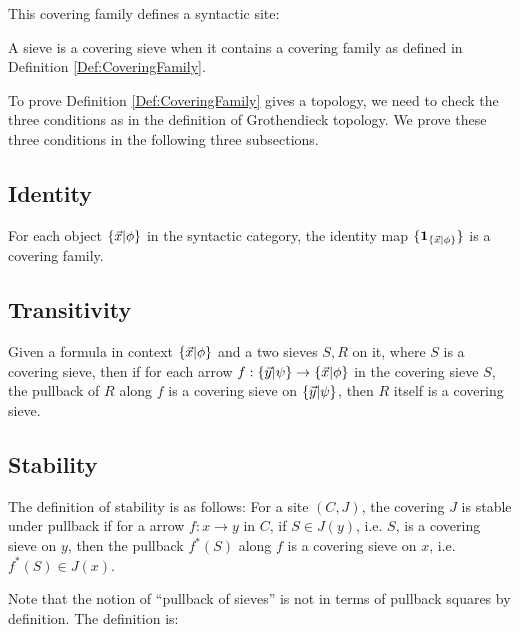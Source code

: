 This covering family defines a syntactic site:

\begin{definition}
  A sieve is a covering sieve when it contains a covering family as defined in Definition \ref{Def:CoveringFamily}. 
\end{definition}

To prove Definition \ref{Def:CoveringFamily} gives a topology, we need to check the three conditions as in the definition of Grothendieck
topology.
We prove these three conditions in the following three subsections.

\subsection{Identity}
\begin{lemma}
  For each object $\{ \vec{x} | \phi \}$ in the syntactic category, the identity map $\{\mathbf{1}_{\{ \vec{x} | \phi \}}\}$ is a covering family.
\end{lemma}

\subsection{Transitivity}
\begin{lemma}[Transitivity]
  Given a formula in context $\{ \vec{x} | \phi \}$ and a two sieves $S,R$ on it, where $S$ is a covering sieve, then if for each arrow $f:\{ \vec{y} | \psi \}\to\{ \vec{x} | \phi \}$ in the
  covering sieve $S$, the pullback of $R$ along $f$ is a covering sieve on $\{ \vec{y} | \psi \}$, then $R$ itself is a covering sieve.
\end{lemma}



\subsection{Stability}

The definition of stability is as follows: For a site $(C,J)$, the covering $J$ is stable under pullback if for a arrow $f:x\to y$ in $C$, 
if $S\in J(y)$, i.e. $S$, is a covering sieve on $y$, then the pullback $f^*(S)$ along $f$ is a covering sieve on $x$, i.e. $f^*(S) \in J(x)$.

Note that the notion of ``pullback of sieves'' is not in terms of pullback squares by definition. The definition is:


